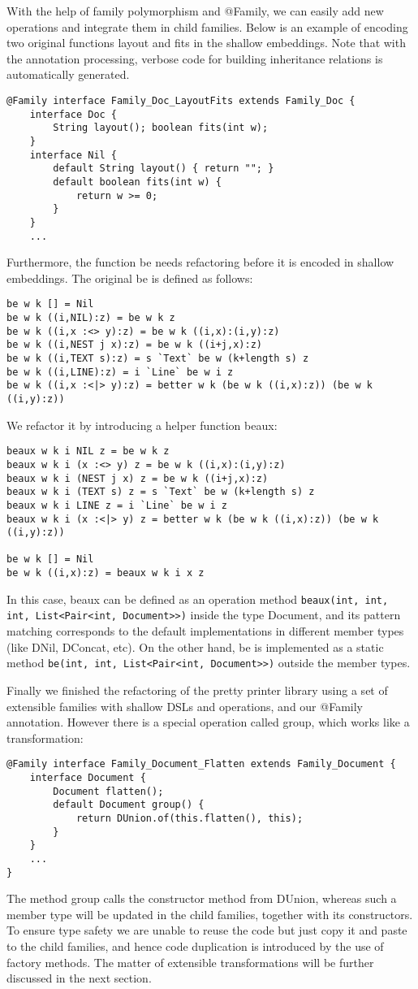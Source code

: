 With the help of family polymorphism and \textsf{@Family}, we can easily add new operations and integrate them
in child families. Below is an example of encoding two original functions \textsf{layout} and \textsf{fits} in
the shallow embeddings. Note that with the annotation processing, verbose code for building inheritance relations is
automatically generated.
\begin{lstlisting}
@Family interface Family_Doc_LayoutFits extends Family_Doc {
	interface Doc {
		String layout(); boolean fits(int w);
	}
	interface Nil {
		default String layout() { return ""; }
		default boolean fits(int w) {
			return w >= 0;
		}
	}
	...
\end{lstlisting}
Furthermore, the function \textsf{be} needs refactoring before it is encoded in shallow embeddings.
The original \textsf{be} is defined as follows:
\begin{lstlisting}
be w k [] = Nil
be w k ((i,NIL):z) = be w k z
be w k ((i,x :<> y):z) = be w k ((i,x):(i,y):z)
be w k ((i,NEST j x):z) = be w k ((i+j,x):z)
be w k ((i,TEXT s):z) = s `Text` be w (k+length s) z
be w k ((i,LINE):z) = i `Line` be w i z
be w k ((i,x :<|> y):z) = better w k (be w k ((i,x):z)) (be w k ((i,y):z))
\end{lstlisting}
We refactor it by introducing a helper function \textsf{beaux}:
\begin{lstlisting}
beaux w k i NIL z = be w k z
beaux w k i (x :<> y) z = be w k ((i,x):(i,y):z)
beaux w k i (NEST j x) z = be w k ((i+j,x):z)
beaux w k i (TEXT s) z = s `Text` be w (k+length s) z
beaux w k i LINE z = i `Line` be w i z
beaux w k i (x :<|> y) z = better w k (be w k ((i,x):z)) (be w k ((i,y):z))

be w k [] = Nil
be w k ((i,x):z) = beaux w k i x z
\end{lstlisting}
In this case, \textsf{beaux} can be defined as an operation method \lstinline{beaux(int, int, int, List<Pair<int, Document>>)} inside the type \textsf{Document}, and
its pattern matching corresponds to the default implementations in different member types (like \textsf{DNil}, \textsf{DConcat}, etc). On the other hand, \textsf{be} is implemented as a static method
\lstinline{be(int, int, List<Pair<int, Document>>)} outside the member types.

Finally we finished the refactoring of the pretty printer library using a set of extensible families with shallow DSLs and operations, and our
\textsf{@Family} annotation. However there is a special operation called \textsf{group}, which works like a transformation:
\begin{lstlisting}
@Family interface Family_Document_Flatten extends Family_Document {
	interface Document {
		Document flatten();
		default Document group() {
			return DUnion.of(this.flatten(), this);
		}
	}
	...
}
\end{lstlisting}
The method \textsf{group} calls the constructor method from \textsf{DUnion}, whereas such a member type will be updated in the
child families, together with its constructors. To ensure type safety we are unable to reuse the code but just copy it and paste
to the child families, and hence code duplication is introduced by the use of factory methods. The matter of extensible
transformations will be further discussed in the next section.
